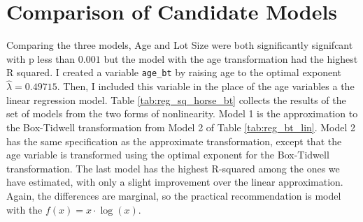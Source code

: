 \pagebreak
\section{Comparison of Candidate Models}

Comparing the three models, Age and Lot Size were both significantly signifcant with p less than $0.001$ but the model with the age transformation had the highest R squared. I created a variable \texttt{age\_bt}
by raising age to the optimal exponent 
$\hat{\lambda} = 0.49715$. 
Then, I included this variable in the place of 
the age variables a the linear regression model.
% 
Table \ref{tab:reg_sq_horse_bt} collects the results
of the set of models from the two forms of nonlinearity.
Model 1 is the approximation to the Box-Tidwell transformation
from Model 2 of Table \ref{tab:reg_bt_lin}. 
Model 2
has the same specification as the approximate transformation, 
except that the age variable is transformed using the optimal
exponent for the Box-Tidwell transformation. 
% 
The last model has the highest R-squared
among the ones we have estimated, 
with only a slight improvement over the linear approximation.
Again, the differences are marginal, so the practical recommendation
is model with the $f(x) = x\cdot\log(x)$.






%
